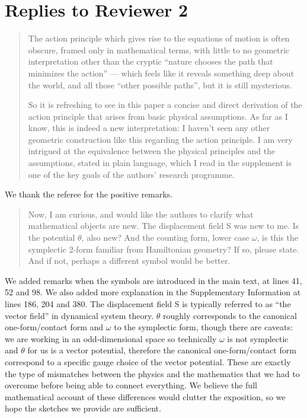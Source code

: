 \documentclass[11pt, executivepaper]{article}
\begin{document}
\section{Replies to Reviewer 2}

\begin{quote}
The action principle which gives rise to the equations of motion is often obscure, framed only in mathematical terms, with little to no geometric interpretation other than the cryptic “nature chooses the path that minimizes the action” — which feels like it reveals something deep about the world, and all those “other possible paths”, but it is still mysterious. 

So it is refreshing to see in this paper a concise and direct derivation of the action principle that arises from basic physical assumptions. As far as I know, this is indeed a new interpretation: I haven’t seen any other geometric construction like this regarding the action principle. I am very intrigued at the equivalence between the physical principles and the assumptions, stated in plain language, which I read in the supplement is one of the key goals of the authors’ research programme. 
\end{quote}

We thank the referee for the positive remarks.

\begin{quote}
	Now, I am curious, and would like the authors to clarify what mathematical objects are new.  The displacement field S was new to me. Is the potential $\theta$, also new?  And the counting form, lower case $\omega$, is this the symplectic 2-form familiar from Hamiltonian geometry?  If so, please state. And if not, perhaps a different symbol would be better.
\end{quote}
We added remarks when the symbols are introduced in the main text, at lines 41, 52 and 98. We also added more explanation in the Supplementary Information at lines 186, 204 and 380. The displacement field S is typically referred to as ``the vector field'' in dynamical system theory. $\theta$ roughly corresponds to the canonical one-form/contact form and $\omega$ to the symplectic form, though there are caveats: we are working in an odd-dimensional space so technically $\omega$ is not symplectic and $\theta$ for us is a vector potential, therefore the canonical one-form/contact form correspond to a specific gauge choice of the vector potential. These are exactly the type of mismatches between the physics and the mathematics that we had to overcome before being able to connect everything. We believe the full mathematical account of these differences would clutter the exposition, so we hope the sketches we provide are sufficient.
\end{document}
